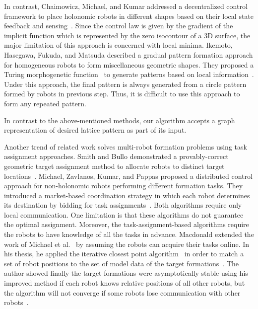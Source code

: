 In contrast, Chaimowicz, Michael, and Kumar addressed a decentralized control
framework to place holonomic robots in different shapes based on their local
state feedback and sensing~\cite{ChaMicKum05}. 
%
Since the control law is given by the gradient of the implicit function which is represented by the zero isocontour of a 3D surface, the major limitation of this approach is concerned with local minima. 
%
Ikemoto, Hasegawa, Fukuda, and Matsuda described a gradual pattern formation approach for homogeneous robots to form miscellaneous geometric shapes.
They proposed a Turing morphogenetic function~\cite{Turing37} to generate patterns based on local information~\cite{IkeHasFukMat05}. 
%
Under this approach, the final pattern is always generated from a circle pattern formed by robots in
previous step. Thus, it is difficult to use this approach to form any repeated
pattern.


In contrast to the above-mentioned methods, our algorithm accepts a graph
representation of desired lattice pattern as part of its input.


Another trend of related work solves multi-robot formation problems using task
assignment approaches. 
%
Smith and Bullo demonstrated a provably-correct geometric target assignment method to allocate robots to distinct target locations~\cite{SmiBul07}.  
%
Michael, Zavlanos, Kumar, and Pappas proposed a distributed control approach for non-holonomic robots performing different formation tasks.  
%
They introduced a market-based coordination strategy in which each robot determines its destination by bidding for task assignments~\cite{MicZavKumPap08}.  
%
Both algorithms require only local communication. 
%
One limitation is that these algorithms do not guarantee the optimal assignment. 
%
Moreover, the task-assignment-based algorithms require the robots to have knowledge of all the tasks in advance.  
%
Macdonald extended the work of Michael et al.~\cite{MicZavKumPap08} by assuming the robots can acquire their
tasks online.  
%
In his thesis, he applied the iterative closest point algorithm~\cite{RusLev01} in order to match a set of
robot positions to the set of model data of the target formations~\cite{Mac11}.  
%
The author showed finally the target formations were asymptotically stable using his improved method if each robot knows relative positions of all other robots, but the algorithm will not converge if
some robots lose communication with other robots~\cite{Mac11}.


